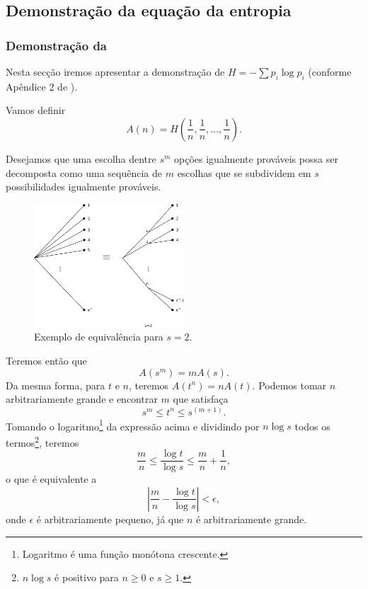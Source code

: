 \subsection{Demonstração da equação da entropia}
\begin{frame}[allowframebreaks]
  \frametitle{Demonstração da }

  Nesta secção iremos apresentar a demonstração de $H=-\sum p_i \log p_i$ 
  (conforme Apêndice 2 de \citet{shannon1948}).

  Vamos definir
  \begin{equation}
  A(n) = H\left( \frac{1}{n}, \frac{1}{n}, \ldots, \frac{1}{n} \right) .
  \end{equation}

  Desejamos que uma escolha dentre $s^m$ opções igualmente prováveis possa ser decomposta como uma sequência de $m$ escolhas
  que se subdividem em $s$ possibilidades igualmente prováveis.

  \begin{figure}[h!]
  \centering
  \includegraphics[width=0.5\textwidth]{images/choices.pdf}
  \caption{Exemplo de equivalência para $s=2$.}
  \label{fig:choiceseqv}
  \end{figure}

  Teremos então que
  \begin{equation}
  A(s^m) = m A(s) .
  \end{equation}
  Da mesma forma, para $t$ e $n$, teremos $A(t^n) = n A(t)$.
  Podemos tomar $n$ arbitrariamente grande e encontrar $m$ que satisfaça
  \begin{equation}
  s^m \leq t^n \leq s^{(m+1)} .
  \end{equation}
  Tomando o logaritmo\footnote{Logaritmo é uma função monótona crescente.} da expressão acima e dividindo 
  por $n \log s$ todos os termos\footnote{$n \log s$ é positivo para $n \geq 0$ e $s \geq 1$.}, teremos
  \begin{equation}
  \frac{m}{n} \leq \frac{\log t}{\log s} \leq \frac{m}{n} + \frac{1}{n} ,
  \end{equation}
  o que é equivalente a 
  \begin{equation}
  \left\vert \frac{m}{n} - \frac{\log t}{\log s} \right\vert < \epsilon ,
  \end{equation}
  onde $\epsilon$ é arbitrariamente pequeno, já que $n$ é arbitrariamente grande.


\end{frame}
